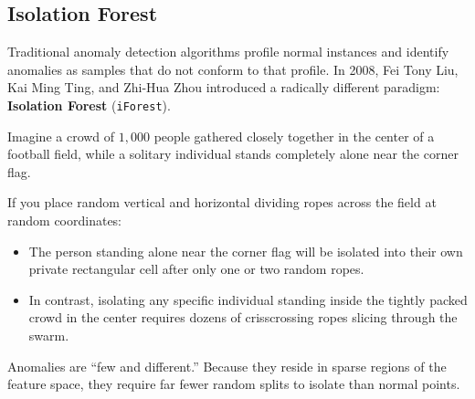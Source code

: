 \subsection{Isolation Forest}\label{subsec:isolation_forest}

Traditional anomaly detection algorithms profile normal instances and identify anomalies as samples that do not conform to that profile. In 2008, Fei Tony Liu, Kai Ming Ting, and Zhi-Hua Zhou introduced a radically different paradigm: \textbf{Isolation Forest} (\texttt{iForest}).

\begin{analogy}
Imagine a crowd of $1{,}000$ people gathered closely together in the center of a football field, while a solitary individual stands completely alone near the corner flag. 

If you place random vertical and horizontal dividing ropes across the field at random coordinates:
\begin{itemize}
    \item The person standing alone near the corner flag will be isolated into their own private rectangular cell after only one or two random ropes.
    \item In contrast, isolating any specific individual standing inside the tightly packed crowd in the center requires dozens of crisscrossing ropes slicing through the swarm.
\end{itemize}
Anomalies are ``few and different.'' Because they reside in sparse regions of the feature space, they require far fewer random splits to isolate than normal points.
\end{analogy}

